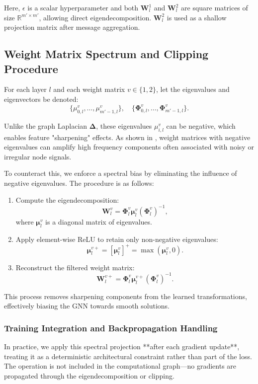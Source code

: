 {Here, $\epsilon$ is a scalar hyperparameter and both $\mathbf{W}_l^1$ and $\mathbf{W}_l^2$ are square matrices of size $\mathbb{R}^{m' \times m'}$, allowing direct eigendecomposition. $\mathbf{W}_l^2$ is used as a shallow projection matrix after message aggregation.

\subsection{ Weight Matrix Spectrum and Clipping Procedure}
\label{app: eigendecomp}
For each layer $l$ and each weight matrix $v \in \{1, 2\}$, let the eigenvalues and eigenvectors be denoted:
\[
\{\mu_{0,l}^{v}, \ldots, \mu_{m'-1,l}^{v} \}, \quad \{\bm{\Phi}_{0,l}^{v}, \ldots, \bm{\Phi}_{m'-1,l}^{v} \}.
\]

Unlike the graph Laplacian $\mathbf{\Delta}$, these eigenvalues $\mu_{i,l}^v$ can be negative, which enables feature "sharpening" effects. As shown in \cite{GRAFF}, weight matrices with negative eigenvalues can amplify high frequency components often associated with noisy or irregular node signals.

To counteract this, we enforce a spectral bias by eliminating the influence of negative eigenvalues. The procedure is as follows:
\begin{enumerate}
    \item Compute the eigendecomposition:
    \[
    \mathbf{W}_l^v = \bm{\Phi}_l^v \bm{\mu}_l^v (\bm{\Phi}_l^{v})^{-1},
    \]
    where $\bm{\mu}_l^v$ is a diagonal matrix of eigenvalues.
    
    \item Apply element-wise ReLU to retain only non-negative eigenvalues:
    \[
    \bm{\mu}_l^{v+} = [\bm{\mu}_l^v]^+ = \max(\bm{\mu}_l^v, 0).
    \]

    \item Reconstruct the filtered weight matrix:
    \[
    \mathbf{W}_l^{v+} = \bm{\Phi}_l^v \bm{\mu}_l^{v+} (\bm{\Phi}_l^{v})^{-1}.
    \]
\end{enumerate}

This process removes sharpening components from the learned transformations, effectively biasing the GNN towards smooth solutions.

\subsubsection{ Training Integration and Backpropagation Handling}

In practice, we apply this spectral projection **after each gradient update**, treating it as a deterministic architectural constraint rather than part of the loss. The operation is not included in the computational graph—no gradients are propagated through the eigendecomposition or clipping.

}
